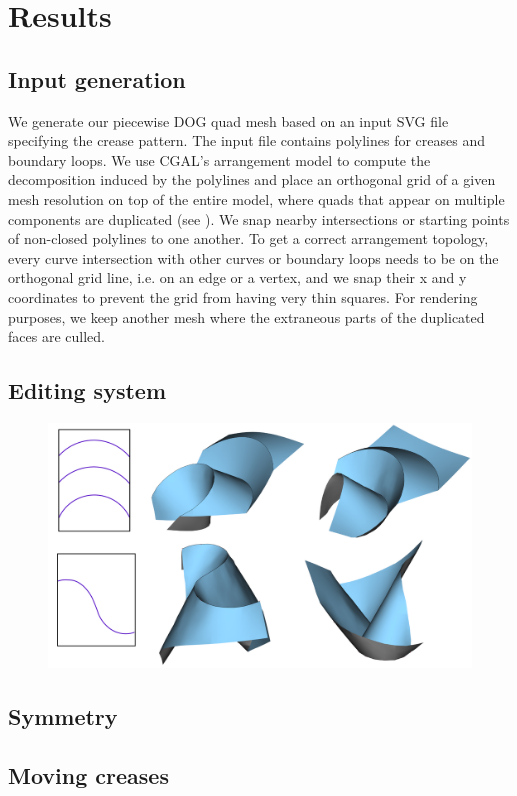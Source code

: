 \section{Results} \label{sec:results}
\subsection{Input generation}
We generate our piecewise DOG quad mesh based on an input SVG file specifying the crease pattern. The input file contains polylines for creases and boundary loops. We use CGAL's arrangement model \cite{cgal,cgal_arr1,cgal_arr2} to compute the decomposition induced by the polylines and place an orthogonal grid of a given mesh resolution on top of the entire model, where quads that appear on multiple components are duplicated (see ). We snap nearby intersections or starting points of non-closed polylines to one another. To get a correct arrangement topology, every curve intersection with other curves or boundary loops needs to be on the orthogonal grid line, i.e. on an edge or a vertex, and we snap their x and y coordinates to prevent the grid from having very thin squares. For rendering purposes, we keep another mesh where the extraneous parts of the duplicated faces are culled.
\subsection{Editing system}
\begin{figure} [h]
	\centering
	\includegraphics[width=\linewidth]{figures/MV_bias_modeling}
	\caption{}
	\label{fig:fold_const_degeneracies}
\end{figure}
\subsection{Symmetry}
\subsection{Moving creases}